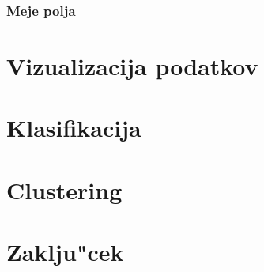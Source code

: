 \documentclass[slovene,11pt]{article}
\begin{document}
		\subsubsection{Meje polja}
	
\section{Vizualizacija podatkov}

\section{Klasifikacija}

\section{Clustering}

\section{Zaklju"cek}
	
\end{document}
